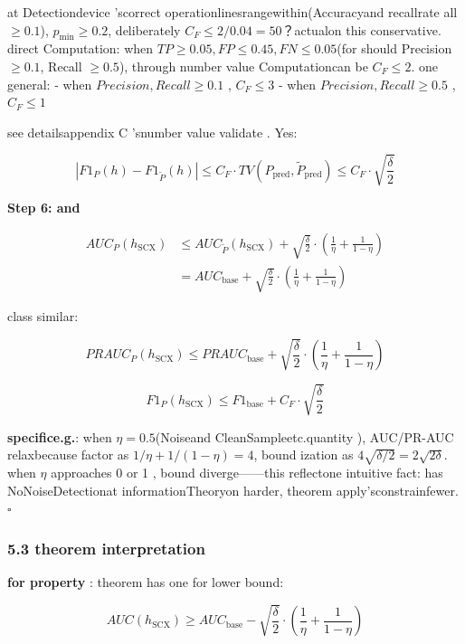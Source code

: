\documentclass[
  12pt,
]{article}
\begin{document}
at Detectiondevice 'scorrect operationlinesrangewithin(Accuracyand recallrate all 
\(\geq 0.1\)), \(p_{\min} \geq 0.2\), deliberately
\(C_F \leq 2 / 0.04 = 50\)？actualon this conservative. direct Computation: when 
\(TP \geq 0.05, FP \leq 0.45, FN \leq 0.05\)(for should  Precision
\(\geq 0.1\), Recall \(\geq 0.5\)), through number value Computationcan be 
\(C_F \leq 2\). one general:  - when  \(Precision, Recall \geq 0.1\)
, \(C_F \leq 3\) - when  \(Precision, Recall \geq 0.5\)
, \(C_F \leq 1\)

see detailsappendix C 'snumber value validate . Yes: 

\[|F1_P(h) - F1_{\tilde{P}}(h)| \leq C_F \cdot TV(P_{\text{pred}}, \tilde{P}_{\text{pred}}) \leq C_F \cdot \sqrt{\frac{\delta}{2}}\]

\textbf{Step 6: and}

\[\begin{aligned}
AUC_P(h_{\text{SCX}}) &\leq AUC_{\tilde{P}}(h_{\text{SCX}}) + \sqrt{\frac{\delta}{2}} \cdot \left(\frac{1}{\eta} + \frac{1}{1-\eta}\right) \\
&= AUC_{\text{base}} + \sqrt{\frac{\delta}{2}} \cdot \left(\frac{1}{\eta} + \frac{1}{1-\eta}\right)
\end{aligned}\]

class similar: 

\[PRAUC_P(h_{\text{SCX}}) \leq PRAUC_{\text{base}} + \sqrt{\frac{\delta}{2}} \cdot \left(\frac{1}{\eta} + \frac{1}{1-\eta}\right)\]

\[F1_P(h_{\text{SCX}}) \leq F1_{\text{base}} + C_F \cdot \sqrt{\frac{\delta}{2}}\]

\textbf{specifice.g.}: when  \(\eta = 0.5\)(Noiseand CleanSampleetc.quantity ), AUC/PR-AUC
relaxbecause factor as  \(1/\eta + 1/(1-\eta) = 4\), bound ization as 
\(4\sqrt{\delta/2} = 2\sqrt{2\delta}\). when  \(\eta\) approaches 0 or  1
, bound diverge------this reflectone intuitive fact: has NoNoiseDetectionat informationTheoryon harder, theorem apply'sconstrainfewer. \(\square\)

\subsubsection{5.3 theorem interpretation}\label{ux5b9aux7406ux89e3ux8bfb}

\textbf{for property }: theorem has one for lower bound: 

\[AUC(h_{\text{SCX}}) \geq AUC_{\text{base}} - \sqrt{\frac{\delta}{2}} \cdot \left(\frac{1}{\eta} + \frac{1}{1-\eta}\right)\]
\end{document}
